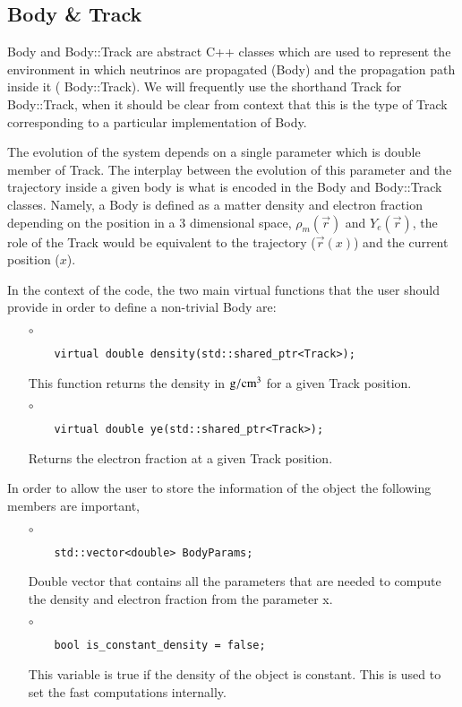 \subsection{Body \& Track}

{\ttf Body} and {\ttf Body::Track} are abstract {\ttf C++} classes
which are used to represent the environment in which neutrinos
are propagated ({\ttf Body}) and the propagation path inside it ({\ttf
  Body::Track}). We will frequently use the shorthand {\ttf Track} for {\ttf Body::Track},
 when it should be clear from context that this is the type of {\ttf Track} 
 corresponding to a particular implementation of {\ttf Body}.

The evolution of the system depends on a single parameter which is
{\ttf double} member of {\ttf Track}. The
interplay between the evolution of this parameter and the trajectory
inside a given body is what is encoded in the {\ttf Body} and 
{\ttf Body::Track} classes. 
Namely, a {\ttf Body} is defined as a matter density and electron
fraction depending on the position in a 3 dimensional space, $\rho_m(\vec{r})$ and
$Y_e(\vec{r})$, the role of the {\ttf Track} would be
equivalent to the trajectory ($\vec{r}(x)$) and the current position ($x$).

In the context of the code, the two main virtual functions that the
user should provide in order to define a non-trivial {\ttf Body} are:
\begin{itemize}
\item[$\circ$] 
  \begin{lstlisting}
    virtual double density(std::shared_ptr<Track>);
  \end{lstlisting}
This function returns the density in ${\rm g}/{\rm cm}^3$ for a
given {\ttf Track} position.
\item[$\circ$] 
  \begin{lstlisting}
    virtual double ye(std::shared_ptr<Track>);
  \end{lstlisting}
Returns the electron fraction at a given {\ttf Track} position.
\end{itemize}

In order to allow the user to store the information of the
object the following members are important,

\begin{itemize}
\item[$\circ$]  
  \begin{lstlisting}
    std::vector<double> BodyParams;
  \end{lstlisting}
  Double vector that contains all the parameters that are
  needed to compute the density and electron fraction from the parameter
  {\ttf x}.
  
\item[$\circ$]  
  \begin{lstlisting}
    bool is_constant_density = false;
  \end{lstlisting}  
  This variable is {\ttf true} if the density of the object is constant. This is
  used to set the fast computations internally.
\end{itemize}


